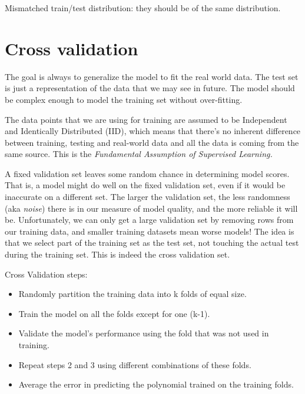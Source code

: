 \documentclass[12pt]{report}
\begin{document}
Mismatched train/test distribution: they should be of the same distribution.


\section{Cross validation}

The goal is always to generalize the model to fit the real world data. The test set is just a representation of the data that we may see in future. The model should be complex enough to model the training set without over-fitting.

The data points that we are using for training are assumed to be Independent and Identically Distributed (IID), which means that there’s no inherent difference between training, testing and real-world data and all the data is coming from the same source. This is the \textit{Fundamental Assumption of Supervised Learning.}


A fixed validation set leaves some random chance in determining model scores. That is, a model might do well on the fixed validation set, even if it would be inaccurate on a different set. The larger the validation set, the less randomness (aka \textit{noise}) there is in our measure of model quality, and the more reliable it will be. Unfortunately, we can only get a large validation set by removing rows from our training data, and smaller training datasets mean worse models! The idea is that we select part of the training set as the test set, not touching the actual test during the training set. This is indeed the cross validation set.

Cross Validation steps:

\begin{itemize}
  \item Randomly partition the training data into k folds of equal size.
  \item Train the model on all the folds except for one (k-1).
  \item Validate the model’s performance using the fold that was not used in training.
  \item Repeat steps 2 and 3 using different combinations of these folds.
  \item Average the error in predicting the polynomial trained on the training folds.
\end{itemize}
\end{document}
